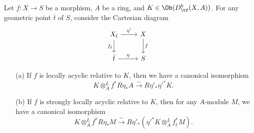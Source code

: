 \begin{proposition}\label{scheme morphism locally acyclic direct image under generalization}
Let $f:X\to S$ be a morphism, $A$ be a ring, and $K\in\Ob(D^b_{\tf}(X,A))$. For any geometric point $\bar{t}$ of $S$, consider the Cartesian diagram
\[\begin{tikzcd}
X_{\bar{t}}\ar[r,"\eta'"]\ar[d,swap,"f_{\bar{t}}"]&X\ar[d,"f"]\\
\bar{t}\ar[r,"\eta"]&S
\end{tikzcd}\]
\begin{enumerate}
    \item[(a)] If $f$ is locally acyclic relative to $K$, then we have a canonical isomorphism
    \[K\otimes_A^Lf^*R\eta_*A\stackrel{\sim}{\to}R\eta'_*\eta'^*K.\]
    \item[(b)] If $f$ is strongly locally acyclic relative to $K$, then for any $A$-module $M$, we have a canonical isomorphism
    \[K\otimes_A^Lf^*R\eta_*M\stackrel{\sim}{\to}R\eta'_*(\eta'^*K\otimes_A^Lf_{\bar{t}}^*M).\]
\end{enumerate}
\end{proposition}
